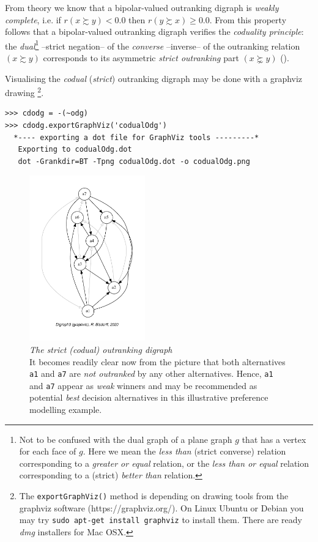 From theory we know that a bipolar-valued outranking digraph is \emph{weakly complete}, i.e. if $r(x \succsim y) < 0.0$ then $r(y \succsim x) \geqslant 0.0$. From this property follows that a bipolar-valued outranking digraph verifies the \emph{coduality principle}: the \emph{dual}\footnote{Not to be confused with the dual graph of a plane graph $g$ that has a vertex for each face of $g$. Here we mean the \emph{less than} (strict converse) relation corresponding to a \emph{greater or equal} relation, or the \emph{less than or equal} relation corresponding to a (strict) \emph{better than} relation.} --strict negation-- of the \emph{converse} --inverse-- of the outranking relation $(x \succsim y)$ corresponds to its asymmetric \emph{strict outranking} part $(x \succnsim y)$  (\citet{BIS-2013,ADT-L7}).

Visualising the \emph{codual} (\emph{strict}) outranking digraph may be done with a graphviz drawing \footnote{The \texttt{exportGraphViz()} method is depending on drawing tools from the graphviz software (https://graphviz.org/). On Linux Ubuntu or Debian you may try \texttt{sudo apt-get install graphviz} to install them. There are ready \emph{dmg} installers for Mac OSX.}.
\begin{lstlisting}
>>> cdodg = -(~odg)
>>> cdodg.exportGraphViz('codualOdg')
  *---- exporting a dot file for GraphViz tools ---------*
   Exporting to codualOdg.dot
   dot -Grankdir=BT -Tpng codualOdg.dot -o codualOdg.png
\end{lstlisting}
\begin{figure}[ht]
\sidecaption[t]
\includegraphics[width=5cm]{Figures/3-1-codualOdg.pdf}
\caption[The strict (codual) outranking digraph]{\emph{The strict (codual) outranking digraph}\\ It becomes readily clear now from the picture that both alternatives \texttt{a1}  and \texttt{a7} are \emph{not outranked} by any other alternatives. Hence, \texttt{a1}  and \texttt{a7} appear as \emph{weak} \Condorcet winners and may be recommended as potential \emph{best} decision alternatives in this illustrative preference modelling example.}
\label{fig:3.1}       %
\end{figure}
 
